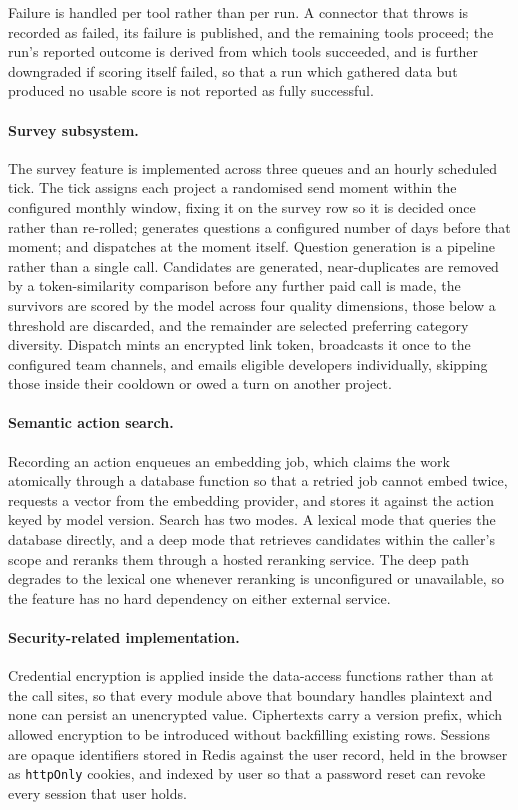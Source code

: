 Failure is handled per tool rather than per run. A connector that throws is
recorded as failed, its failure is published, and the remaining tools proceed;
the run's reported outcome is derived from which tools succeeded, and is further
downgraded if scoring itself failed, so that a run which gathered data but
produced no usable score is not reported as fully successful.

\paragraph{Survey subsystem.}
The survey feature is implemented across three queues and an hourly scheduled
tick. The tick assigns each project a randomised send moment within the
configured monthly window, fixing it on the survey row so it is decided once
rather than re-rolled; generates questions a configured number of days before
that moment; and dispatches at the moment itself. Question generation is a
pipeline rather than a single call. Candidates are generated, near-duplicates are
removed by a token-similarity comparison before any further paid call is made,
the survivors are scored by the model across four quality dimensions, those below
a threshold are discarded, and the remainder are selected preferring category
diversity. Dispatch mints an encrypted link token, broadcasts it once to the
configured team channels, and emails eligible developers individually, skipping
those inside their cooldown or owed a turn on another project.

\paragraph{Semantic action search.}
Recording an action enqueues an embedding job, which claims the work atomically
through a database function so that a retried job cannot embed twice, requests a
vector from the embedding provider, and stores it against the action keyed by
model version. Search has two modes. A lexical mode that queries the database
directly, and a deep mode that retrieves candidates within the caller's scope and
reranks them through a hosted reranking service. The deep path degrades to the
lexical one whenever reranking is unconfigured or unavailable, so the feature has
no hard dependency on either external service.

\paragraph{Security-related implementation.}
Credential encryption is applied inside the data-access functions rather than at
the call sites, so that every module above that boundary handles plaintext and
none can persist an unencrypted value. Ciphertexts carry a version prefix, which
allowed encryption to be introduced without backfilling existing rows. Sessions
are opaque identifiers stored in Redis against the user record, held in the
browser as \texttt{httpOnly} cookies, and indexed by user so that a password
reset can revoke every session that user holds.

